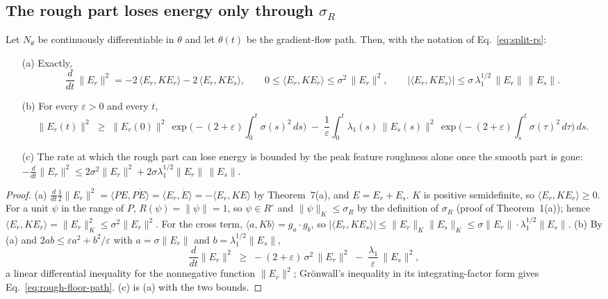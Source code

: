 \subsection{The rough part loses energy only through $\sigma_R$}

\begin{proposition}
\label{prop:rough-energy}
Let $N_\theta$ be continuously differentiable in $\theta$ and let $\theta(t)$
be the gradient-flow path. Then, with the notation of
Eq.~\eqref{eq:split-rs}:
\begin{enumerate}
\item[(a)] Exactly,
\begin{equation}
\frac{d}{dt}\,\|E_r\|^2 = -2\,\langle E_r, K E_r\rangle - 2\,\langle E_r, K E_s\rangle,
\qquad
0 \le \langle E_r, K E_r\rangle \le \sigma^2\,\|E_r\|^2,
\qquad
|\langle E_r, K E_s\rangle| \le \sigma\,\lambda_1^{1/2}\,\|E_r\|\,\|E_s\|.
\label{eq:rough-rate}
\end{equation}
\item[(b)] For every $\varepsilon>0$ and every $t$,
\begin{equation}
\|E_r(t)\|^2 \;\ge\; \|E_r(0)\|^2\,
\exp\!\Big(-(2+\varepsilon)\!\int_0^t \sigma(s)^2\,ds\Big)
\;-\;\frac{1}{\varepsilon}\int_0^t \lambda_1(s)\,\|E_s(s)\|^2\,
\exp\!\Big(-(2+\varepsilon)\!\int_s^t \sigma(\tau)^2\,d\tau\Big)\,ds .
\label{eq:rough-floor-path}
\end{equation}
\item[(c)] The rate at which the rough part can lose energy is bounded by the
peak feature roughness alone once the smooth part is gone:
$-\frac{d}{dt}\|E_r\|^2 \le 2\sigma^2\|E_r\|^2 + 2\sigma\lambda_1^{1/2}\|E_r\|\,\|E_s\|$.
\end{enumerate}
\end{proposition}

\begin{proof}
(a) $\frac{d}{dt}\frac12\|E_r\|^2 = \langle PE, P\dot E\rangle = \langle E_r,\dot E\rangle = -\langle E_r, KE\rangle$
by Theorem~7(a), and $E = E_r+E_s$. $K$ is positive semidefinite, so
$\langle E_r,KE_r\rangle\ge0$. For a unit $\psi$ in the range of $P$,
$R(\psi)=\|\psi\|=1$, so $\psi\in R^\circ$ and $\|\psi\|_K\le\sigma_R$ by the
definition of $\sigma_R$ (proof of Theorem~1(a)); hence
$\langle E_r,KE_r\rangle=\|E_r\|_K^2\le\sigma^2\|E_r\|^2$. For the cross
term, $\langle a,Kb\rangle = g_a\cdot g_b$, so
$|\langle E_r,KE_s\rangle|\le \|E_r\|_K\|E_s\|_K\le \sigma\|E_r\|\cdot\lambda_1^{1/2}\|E_s\|$.
(b) By (a) and $2ab\le \varepsilon a^2+b^2/\varepsilon$ with
$a=\sigma\|E_r\|$ and $b=\lambda_1^{1/2}\|E_s\|$,
\[
\frac{d}{dt}\|E_r\|^2 \;\ge\; -(2+\varepsilon)\,\sigma^2\,\|E_r\|^2 \;-\;\frac{\lambda_1}{\varepsilon}\,\|E_s\|^2 ,
\]
a linear differential inequality for the nonnegative function $\|E_r\|^2$;
Gr\"onwall's inequality in its integrating-factor form gives
Eq.~\eqref{eq:rough-floor-path}. (c) is (a) with the two bounds.
\end{proof}

